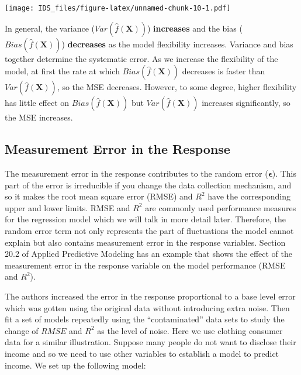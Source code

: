 \documentclass[12pt,]{krantz}
\theoremstyle{definition}
\theoremstyle{definition}
\theoremstyle{definition}
\theoremstyle{remark}
\begin{document}
\texttt{[image: IDS\_files/figure-latex/unnamed-chunk-10-1.pdf]}

In general, the variance (\(Var(\hat{f}(\mathbf{X}))\))
\textbf{increases} and the bias (\(Bias(\hat{f}(\mathbf{X}))\))
\textbf{decreases} as the model flexibility increases. Variance and bias
together determine the systematic error. As we increase the flexibility
of the model, at first the rate at which \(Bias(\hat{f}(\mathbf{X}))\)
decreases is faster than \(Var (\hat{f} (\mathbf{X}))\), so the MSE
decreases. However, to some degree, higher flexibility has little effect
on \(Bias(\hat{f}(\mathbf{X}))\) but \(Var(\hat{f} (\mathbf{X}))\)
increases significantly, so the MSE increases.

\subsection{Measurement Error in the
Response}\label{measurement-error-in-the-response}

The measurement error in the response contributes to the random error
(\(\mathbf{\epsilon}\)). This part of the error is irreducible if you
change the data collection mechanism, and so it makes the root mean
square error (RMSE) and \(R^2\) have the corresponding upper and lower
limits. RMSE and \(R^2\) are commonly used performance measures for the
regression model which we will talk in more detail later. Therefore, the
random error term not only represents the part of fluctuations the model
cannot explain but also contains measurement error in the response
variables. Section 20.2 of Applied Predictive Modeling \citep{APM} has
an example that shows the effect of the measurement error in the
response variable on the model performance (RMSE and \(R^2\)).

The authors increased the error in the response proportional to a base
level error which was gotten using the original data without introducing
extra noise. Then fit a set of models repeatedly using the
``contaminated'' data sets to study the change of \(RMSE\) and \(R^2\)
as the level of noise. Here we use clothing consumer data for a similar
illustration. Suppose many people do not want to disclose their income
and so we need to use other variables to establish a model to predict
income. We set up the following model:
\end{document}
